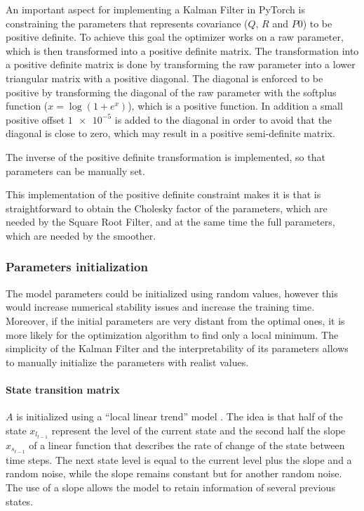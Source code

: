 \documentclass{article}
\begin{document}
An important aspect for implementing a Kalman Filter in PyTorch is constraining the parameters that represents covariance ($Q$, $R$ and $P0$) to be positive definite. To achieve this goal the optimizer works on a raw parameter, which is then transformed into a positive definite matrix.
The transformation into a positive definite matrix is done by transforming the raw parameter into a lower triangular matrix with a positive diagonal. The diagonal is enforced to be positive by transforming the diagonal of the raw parameter with the softplus function ($x = \log (1 + e^{x})$), which is a positive function.
 In addition a small positive offset $\num{1e-5}$ is added to the diagonal in order to avoid that the diagonal is close to zero, which may result in a positive semi-definite matrix.

The inverse of the positive definite transformation is implemented, so that parameters can be manually set.

This implementation of the positive definite constraint makes it is that is straightforward to obtain the Cholesky factor of the parameters, which are needed by the Square Root Filter, and at the same time the full parameters, which are needed by the smoother.

\subsubsection{Parameters initialization}

The model parameters could be initialized using random values, however this would increase numerical stability issues and increase the training time. Moreover, if the initial parameters are very distant from the optimal ones, it is more likely for the optimization algorithm to find only a local minimum.  The simplicity of the Kalman Filter and the interpretability of its parameters allows to manually initialize the parameters with realist values.

\paragraph{State transition matrix} $A$ is initialized using a ``local linear trend'' model \cite{durbin_time_2012}. The idea is that half of the state $x_{l_{t-1}}$ represent the level of the current state and the second half the slope $x_{s_{t-1}}$ of a linear function that describes the rate of change of the state between time steps. The next state level is equal to the current level plus the slope and a random noise, while the slope remains constant but for another random noise. The use of a slope allows the model to retain information of several previous states.
\end{document}

